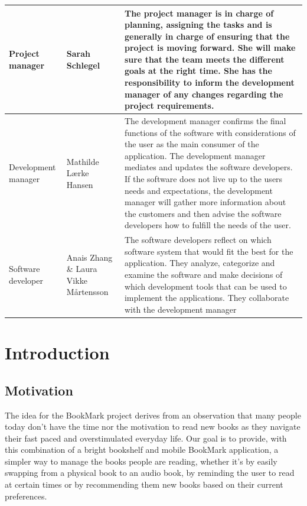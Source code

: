 \documentclass[conference]{IEEEtran}
\begin{document}
\begin{center}
\begin{tabular}{ | m{1.8cm} | m{1.5cm}| m{4.2cm} | } 

 \hline
 Project manager & Sarah Schlegel & The project manager is in charge of planning, assigning the tasks and is generally in charge of ensuring that the project is moving forward. She will make sure that the team meets the different goals at the right time. She has the responsibility to inform the development manager of any changes regarding the project requirements. \\
  \hline
  Development manager &  Mathilde Lærke Hansen & The development manager confirms the final functions of the software with considerations of the user as the main consumer of the application. The development manager mediates and updates the software developers. If the software does not live up to the users needs and expectations, the development manager will gather more information about the customers and then advise the software developers how to fulfill the needs of the user.\\
  \hline
 Software developer & Anais Zhang \&  Laura Vikke Mårtensson & The software developers reflect on which software system that would fit the best for the application. They analyze, categorize and examine the software and make decisions of which development tools that can be used to implement the applications. They collaborate with the development manager \\ 
 \hline
\end{tabular}
\end{center}



\section{Introduction}

\subsection*{Motivation}
The idea for the BookMark project derives from an observation that many people today don't have the time nor the motivation to read new books as they navigate their fast paced and overstimulated everyday life. Our goal is to provide, with this combination of a bright bookshelf and mobile BookMark application, a simpler way to manage the books people are reading, whether it's by easily swapping from a physical book to an audio book, by reminding the user to read at certain times or by recommending them new books based on their current preferences. \\ \\
\end{document}
